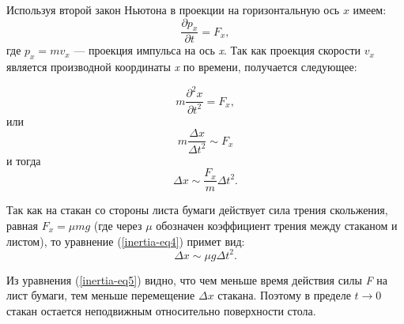\documentclass[14pt,a4paper,oneside]{extarticle}	%
\begin{document}
Используя второй закон Ньютона в проекции на горизонтальную ось $ x $ имеем:
\begin{equation}\label{inertia-eq1}
\frac{\partial p_{x}}{\partial t} = F_{x},
\end{equation}
где $ p_{x}=mv_{x} $ — проекция импульса на ось \textit{x}.
Так как проекция скорости $v_{x}$ является производной координаты \textit{x} по времени, получается следующее:
 
 \begin{equation}\label{inertia-eq2}
 m\frac{\partial^{2} x}{\partial t^{2}} = F_{x},
 \end{equation}
или
\begin{equation}\label{inertia-eq3}
m\frac{\Delta x}{\Delta t^{2}} \sim F_{x}
\end{equation}
и тогда 
\begin{equation}\label{inertia-eq4}
\Delta x \sim \frac{F_{x}}{m} \Delta t^{2}.
\end{equation}

Так как на стакан со стороны листа бумаги действует сила трения скольжения, равная $ F_{x} = \mu mg $ (где через $\mu$ обозначен коэффициент трения между стаканом и листом), то уравнение (\ref{inertia-eq4}) примет вид:
\begin{equation}\label{inertia-eq5}
\Delta x \sim \mu g\Delta t^{2}.
\end{equation}

Из уравнения (\ref{inertia-eq5}) видно, что чем меньше время действия силы \textit{F} на лист бумаги, тем меньше перемещение $ \Delta x $ стакана.
Поэтому в пределе \mbox{$ t\longrightarrow0 $} стакан остается неподвижным относительно поверхности стола.  
\end{document}

